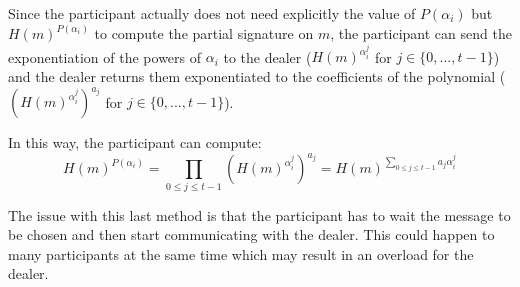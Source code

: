 Since the participant actually does not need explicitly the value of $P(\alpha_i)$ but $H(m)^{P(\alpha_i)}$ to compute the partial signature on $m$, the participant can send the exponentiation of the powers of $\alpha_i$ to the dealer ($H(m)^{\alpha_i^j}$ for $j \in \{0, ..., t-1 \}$) and the dealer returns them exponentiated to the coefficients of the polynomial ($\left(H(m)^{\alpha_i^j}\right)^{a_j}$ for $j \in \{0, ..., t-1 \}$).

In this way, the participant can compute: $$H(m)^{P(\alpha_i)} = \prod_{0\leq j \leq t-1} \left(H(m)^{\alpha_i^j}\right)^{a_j} = H(m)^{\sum_{0\leq j \leq t-1} a_j \alpha_i^j}$$

The issue with this last method is that the participant has to wait the message to be chosen and then start communicating with the dealer. This could happen to many participants at the same time which may result in an overload for the dealer.